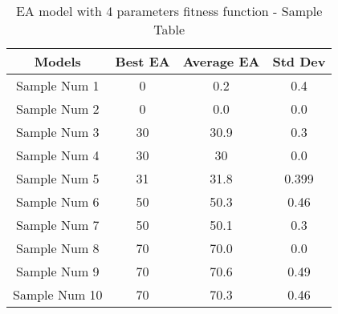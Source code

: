 \documentclass{article}
\begin{document}
\begin{table}[h]
\centering
\caption{EA model with 4 parameters fitness function - Sample Table}
\label{tab:sample}
\begin{tabular}{|c|c|c|c|}
\hline
\textbf{Models} & \textbf{Best EA} & \textbf{Average EA} & \textbf{Std Dev} \\
\hline
Sample Num 1 & 0 & 0.2 & 0.4 \\
\hline
Sample Num 2 & 0 & 0.0 & 0.0 \\
\hline
Sample Num 3 & 30 & 30.9 & 0.3 \\
\hline
Sample Num 4 & 30 & 30 & 0.0 \\
\hline
Sample Num 5 & 31 & 31.8 & 0.399 \\
\hline
Sample Num 6 & 50 & 50.3 & 0.46 \\
\hline
Sample Num 7 & 50 & 50.1 & 0.3 \\
\hline
Sample Num 8 & 70 & 70.0 & 0.0 \\
\hline
Sample Num 9 & 70 & 70.6 & 0.49 \\
\hline
Sample Num 10 & 70 & 70.3 & 0.46 \\
\hline
\end{tabular}
\end{table}
\end{document}
